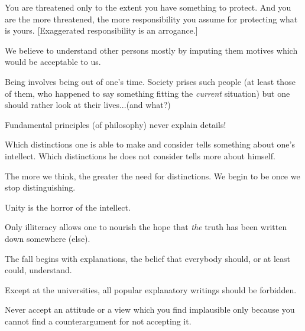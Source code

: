
\pa You are threatened only to the extent you have something to
protect.  And you are the more threatened, the more responsibility you
assume for protecting what is yours.  [Exaggerated responsibility is
an arrogance.]


\pa
We believe to understand other persons mostly by imputing them motives
which would be acceptable to us. 

\pa
Being  involves being out of one's time. Society prises
such people (at least those of them, who happened to say something fitting the
{\em current} situation) but one should rather look at their lives...(and what?)

\pa
Fundamental principles (of philosophy) never explain details!

\pa
Which distinctions one is able to make and consider tells something 
about one's intellect. Which distinctions he does not consider tells 
more about himself.

The more we think, the greater the need for distinctions. We begin to 
be once we stop distinguishing.

\pa
Unity is the horror of the intellect.

\pa
Only illiteracy allows one to nourish the hope that {\em the} truth
has been written down somewhere (else).

\pa
The fall begins with explanations, the belief that everybody should,
or at least could, understand.

Except at the universities, all popular explanatory writings should be forbidden.


\pa
Never accept an attitude or a view which you find implausible 
only because you cannot find a counterargument for 
not accepting it.



